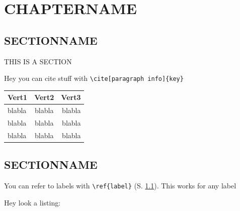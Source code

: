\documentclass[../Main/main.tex]{subfiles}
\begin{document}
\chapter{CHAPTERNAME}\label{CHAPTERLABEL}

\section{SECTIONNAME}\label{SECTIONLABEL}

THIS IS A SECTION

Hey you can cite stuff with \verb!\cite[paragraph info]{key}!\cite[blabla]{mycitation}

\begin{figure}[H]
\centering
{}
\label{FIGURELABEL}
\end{figure}

\begin{table}[H]
\centering
    \begin{tabular}{|l|c|r|}
        \hline
        \textbf{Vert1}&\textbf{Vert2} & \textbf{Vert3}\Tstrut\Bstrut\\
        \hline
        blabla & blabla & blabla\Tstrut\\
        blabla & blabla & blabla\\
        blabla & blabla & blabla\Bstrut\\
        \hline
    \end{tabular}
\label{TABLELABEL}
\end{table}

\section{SECTIONNAME}

You can refer to labels with \verb!\ref{label}! (S. \ref{SECTIONLABEL}).
This works for any label

Hey look a listing:
\end{document}

